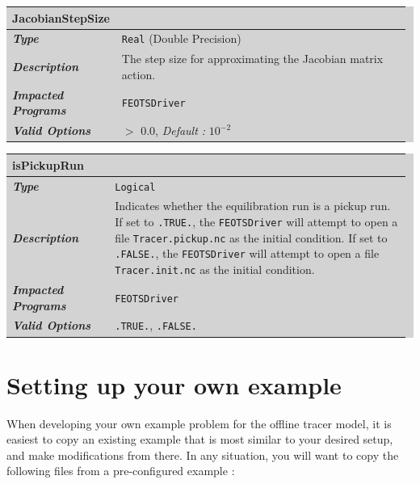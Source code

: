 \documentclass{softwaremanual}
\begin{document}
\noindent\begingroup\setlength{\fboxsep}{0pt}
\colorbox{lightgray}{
\begin{tabular}{p{0.25\linewidth} p{0.725\linewidth}}
\toprule
\textbf{JacobianStepSize} & \\
\midrule
\textbf{\textit{Type}} & \texttt{Real} (Double Precision) \\
\midrule
\textbf{\textit{Description}} & The step size for approximating the Jacobian matrix action. \\
\midrule
\textbf{\textit{Impacted Programs}} & \texttt{FEOTSDriver} \\
\midrule
\textbf{\textit{Valid Options}}  & $>$ 0.0, \textit{Default :} $10^{-2}$\\
\bottomrule
\end{tabular}
}\endgroup

\noindent\begingroup\setlength{\fboxsep}{0pt}
\colorbox{lightgray}{
\begin{tabular}{p{0.25\linewidth} p{0.725\linewidth}}
\toprule
\textbf{isPickupRun} & \\
\midrule
\textbf{\textit{Type}} & \texttt{Logical} \\
\midrule
\textbf{\textit{Description}} & Indicates whether the equilibration run is a pickup run. If set to \texttt{.TRUE.}, the \texttt{FEOTSDriver} will attempt to open a file \texttt{Tracer.pickup.nc} as the initial condition. If set to \texttt{.FALSE.}, the \texttt{FEOTSDriver} will attempt to open a file \texttt{Tracer.init.nc} as the initial condition. \\
\midrule
\textbf{\textit{Impacted Programs}} & \texttt{FEOTSDriver} \\
\midrule
\textbf{\textit{Valid Options}}  & \texttt{.TRUE.}, \texttt{.FALSE.} \\
\bottomrule
\end{tabular}
}\endgroup


\section{Setting up your own example}
 When developing your own example problem for the offline tracer model, it is easiest to copy an existing example that is most similar to your desired setup, and make modifications from there. In any situation, you will want to copy the following files from a pre-configured example :
 
\end{document}
